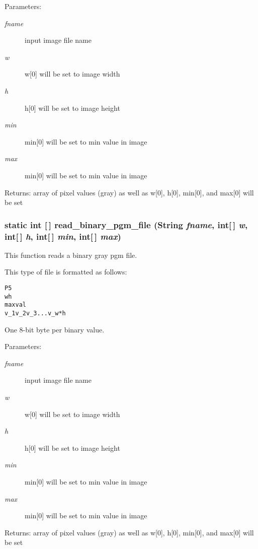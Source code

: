 \begin{Desc}
\item[Parameters:]
\begin{description}
\item[{\em fname}]input image file name \item[{\em w}]w[0] will be set to image width \item[{\em h}]h[0] will be set to image height \item[{\em min}]min[0] will be set to min value in image \item[{\em max}]min[0] will be set to min value in image\end{description}
\end{Desc}
\begin{Desc}
\item[Returns:]array of pixel values (gray) as well as w[0], h[0], min[0], and max[0] will be set \end{Desc}
\subsubsection{\setlength{\rightskip}{0pt plus 5cm}static int [$\,$] read\_\-binary\_\-pgm\_\-file (String {\em fname}, int[$\,$] {\em w}, int[$\,$] {\em h}, int[$\,$] {\em min}, int[$\,$] {\em max})\hspace{0.3cm}{\tt  [static, protected]}}\label{class_c_s_image_viewer_1_1pnm_helper_3f3225357e1bccdb373db8251b629030}


This function reads a binary gray pgm file. 

This type of file is formatted as follows: \small\begin{alltt}
    P5
    w h
    maxval
    v\_1 v\_2 v\_3 . . . v\_w*h
  \end{alltt}\normalsize 
 One 8-bit byte per binary value.

\begin{Desc}
\item[Parameters:]
\begin{description}
\item[{\em fname}]input image file name \item[{\em w}]w[0] will be set to image width \item[{\em h}]h[0] will be set to image height \item[{\em min}]min[0] will be set to min value in image \item[{\em max}]min[0] will be set to min value in image\end{description}
\end{Desc}
\begin{Desc}
\item[Returns:]array of pixel values (gray) as well as w[0], h[0], min[0], and max[0] will be set \end{Desc}
